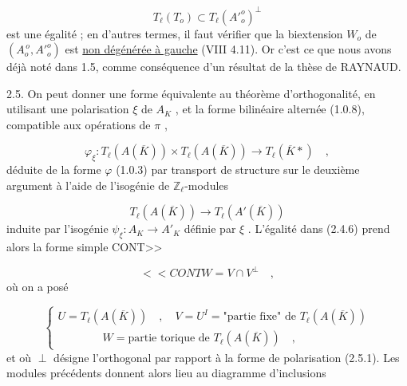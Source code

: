 \begin{equation}\tag{2.4.7}
T_{\ell}(T_{o}) \subset T_{\ell}({A'}^{o}_{o})^{\perp}
\end{equation}
est une égalité ; en d'autres termes, il faut vérifier que la biextension $W_{o}$ de $(A_{o}^{\,o},{A'}^{o}_{o})$ est \underline{non dégénérée à gauche} (VIII 4.11). Or c'est ce que nous avons déjà noté dans 1.5, comme conséquence d'un résultat de la thèse de RAYNAUD.

2.5.  On peut donner une forme équivalente au théorème d'orthogonalité, en utilisant une polarisation $\xi$ de $A_{K}$ , et la forme bilinéaire alternée (1.0.8), compatible aux opérations de $\pi$ ,

\begin{equation}\tag{2.5.1}
\varphi_{\xi} : T_{\ell}(A(\overline{K})) \times T_{\ell}(A(\overline{K})) \longrightarrow T_{\ell}(\overline{K}*) \quad ,
\end{equation}
déduite de la forme $\varphi$ (1.0.3) par transport de structure sur le deuxième argument à l'aide de l'isogénie de $\mathbb{Z}_{\ell}$-modules

\begin{equation*}
T_{\ell}(A(\overline{K})) \longrightarrow T_{\ell}(A'(\overline{K}))
\end{equation*}
induite par l'isogénie $\psi_{\xi} : A_{K} \longrightarrow A'_{K}$ définie par $\xi$ . L'égalité dans (2.4.6) prend alors la forme simple CONT>>



\begin{equation}\tag{2.5.2}
<<CONT W = V \cap V^{\perp} \quad ,
\end{equation}
où on a posé

\begin{equation}\tag{2.5.3}
\left\{
\begin{array}{l}
U = T_{\ell}(A(\overline{K})) \quad , \quad V = U^{I} = \text{"partie fixe" de } T_{\ell}(A(\overline{K})) \\[3mm]
\hspace{4em} W = \text{partie torique de } T_{\ell}(A(\overline{K})) \quad ,
\end{array}
\right.
\end{equation}
et où $\perp$ désigne l'orthogonal par rapport à la forme de polarisation (2.5.1). Les modules précédents donnent alors lieu au diagramme d'inclusions

